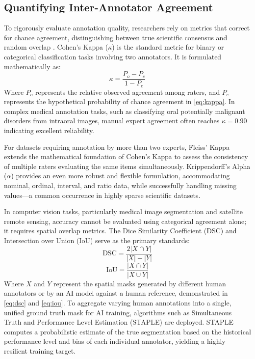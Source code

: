 \documentclass[conference]{IEEEtran}
\begin{document}
\subsection{Quantifying Inter-Annotator Agreement}
To rigorously evaluate annotation quality, researchers rely on metrics that correct for chance agreement, distinguishing between true scientific consensus and random overlap \cite{ref3}. Cohen's Kappa ($\kappa$) is the standard metric for binary or categorical classification tasks involving two annotators. It is formulated mathematically as:
\begin{equation}
\kappa = \frac{P_o - P_e}{1-P_e}
\label{eq:kappa}
\end{equation}
Where $P_o$ represents the relative observed agreement among raters, and $P_e$ represents the hypothetical probability of chance agreement in \eqref{eq:kappa}. In complex medical annotation tasks, such as classifying oral potentially malignant disorders from intraoral images, manual expert agreement often reaches $\kappa = 0.90$ indicating excellent reliability.

For datasets requiring annotation by more than two experts, Fleiss' Kappa extends the mathematical foundation of Cohen's Kappa to assess the consistency of multiple raters evaluating the same items simultaneously. Krippendorff's Alpha ($\alpha$) provides an even more robust and flexible formulation, accommodating nominal, ordinal, interval, and ratio data, while successfully handling missing values---a common occurrence in highly sparse scientific datasets.

In computer vision tasks, particularly medical image segmentation and satellite remote sensing, accuracy cannot be evaluated using categorical agreement alone; it requires spatial overlap metrics. The Dice Similarity Coefficient (DSC) and Intersection over Union (IoU) serve as the primary standards:
\begin{equation}
\text{DSC} = \frac{2|X \cap Y|}{|X| + |Y|}
\label{eq:dsc}
\end{equation}
\begin{equation}
\text{IoU} = \frac{|X \cap Y|}{|X \cup Y|}
\label{eq:iou}
\end{equation}
Where $X$ and $Y$ represent the spatial masks generated by different human annotators or by an AI model against a human reference, demonstrated in \eqref{eq:dsc} and \eqref{eq:iou}. To aggregate varying human annotations into a single, unified ground truth mask for AI training, algorithms such as Simultaneous Truth and Performance Level Estimation (STAPLE) are deployed. STAPLE computes a probabilistic estimate of the true segmentation based on the historical performance level and bias of each individual annotator, yielding a highly resilient training target.
\end{document}
